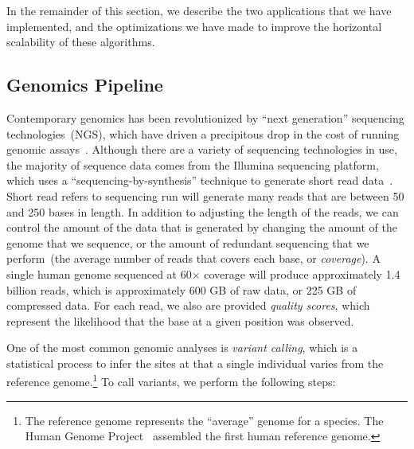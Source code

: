 \documentclass{acm_proc_article-sp}
\begin{document}
In the remainder of this section, we describe the two applications that we have implemented, and the
optimizations we have made to improve the horizontal scalability of these algorithms.

\subsection{Genomics Pipeline}
\label{sec:genomics-pipeline}

Contemporary genomics has been revolutionized by ``next generation'' sequencing
technologies~(NGS), which have \linebreak driven a precipitous drop in the cost of running genomic
assays~\cite{nhgri}. Although there are a variety of sequencing technologies in use, the majority of
sequence data comes from the Illumina sequencing platform, which uses a ``sequencing-by-synthesis''
technique to generate short read data~\cite{metzker09}. Short read refers to 
sequencing run will generate many reads that are between 50 and 250 bases in length. In addition to
adjusting the length of the reads, we can control the amount of the data that is generated by
changing the amount of the genome that we sequence, or the amount of redundant sequencing that
we perform~(the average number of reads that covers each base, or \emph{coverage}). A single
human genome sequenced at 60$\times$ coverage will produce approximately 1.4 billion reads,
which is approximately 600 GB of raw data, or 225 GB of compressed data. For each read, we also
are provided \emph{quality scores}, which represent the likelihood that the base at a given position
was observed.

One of the most common genomic analyses is \emph{variant calling}, which is a statistical process to
infer the sites at that a single individual varies from the reference genome.\footnote{The
reference genome represents the ``average'' genome for a species. The Human Genome
Project~\cite{lander01} assembled the first human reference genome.} To call variants, we perform the
following steps:
\end{document}
